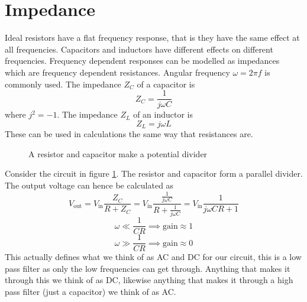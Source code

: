 \documentclass{article}
\begin{document}
    \section{Impedance}
    Ideal resistors have a flat frequency response, that is they have the same effect at all frequencies.
    Capacitors and inductors have different effects on different frequencies.
    Frequency dependent responses can be modelled as impedances which are frequency dependent resistances.
    Angular frequency \(\omega = 2\pi f\) is commonly used.
    The impedance \(Z_C\) of a capacitor is
    \[Z_C = \frac{1}{j\omega C}\]
    where \(j^2 = -1\).
    The impedance \(Z_L\) of an inductor is
    \[Z_L = j\omega L\]
    These can be used in calculations the same way that resistances are.
    \begin{figure}[ht]
        \centering
        \caption{A resistor and capacitor make a potential divider}
        \label{fig:resistor-capacitor potential divider}
    \end{figure}
    Consider the circuit in figure \ref{fig:resistor-capacitor potential divider}. 
    The resistor and capacitor form a parallel divider.
    The output voltage can hence be calculated as
    \[V_\text{out} = V_\text{in}\frac{Z_C}{R + Z_C} = V_\text{in}\frac{\frac{1}{j\omega C}}{R + \frac{1}{j\omega C}} = V_\text{in}\frac{1}{j\omega CR + 1}\]
    \[\omega \ll \frac{1}{CR}\implies \text{gain}\approx 1\]
    \[\omega \gg \frac{1}{CR}\implies \text{gain}\approx 0\]
    This actually defines what we think of as AC and DC for our circuit, this is a low pass filter as only the low frequencies can get through.
    Anything that makes it through this we think of as DC, likewise anything that makes it through a high pass filter (just a capacitor) we think of as AC.
    
\end{document}
